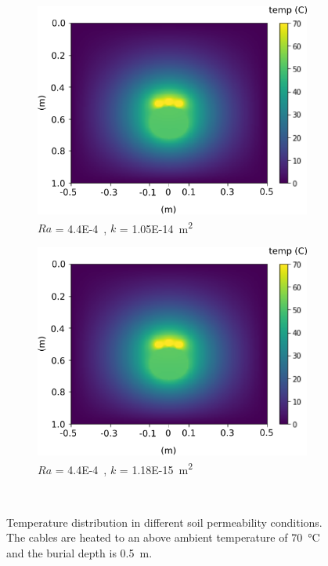 \documentclass[Journal,letterpaper,InsideFigs]{ascelike-new}
\begin{document}
\begin{figure}[ht]
\begin{subfigure}[b]{0.49\textwidth}
    \includegraphics[width=\textwidth]{figs/ra/0p0049.png}
    \caption{$Ra$ = \SI{4.4E-4}, $k$ = \SI{1.05E-14}{\meter\squared}}
 \end{subfigure}
 \begin{subfigure}[b]{0.49\textwidth}
    \includegraphics[width=\textwidth]{figs/ra/0p00049.png}
    \caption{$Ra$ = \SI{4.4E-4}, $k$ = \SI{1.18E-15}{\meter\squared}}
 \end{subfigure}\\ 
 \caption{Temperature distribution in different soil permeability conditions. The cables are heated to an above ambient temperature of \SI{70}{\celsius} and the burial depth is \SI{0.5}{\meter}.}
 \label{fig:ra-evol}
\end{figure}
\end{document}
